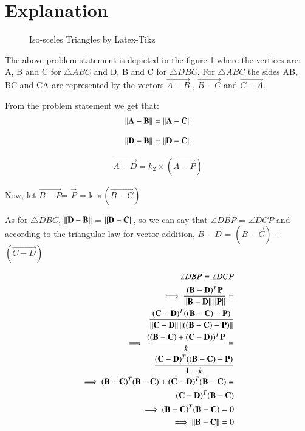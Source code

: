 \documentclass[journal,12pt,twocolumn]{IEEEtran}
\begin{document}
\section{Explanation}
\begin{figure}[!ht]
\centering
\resizebox{\columnwidth}{!}{}
\caption{Iso-sceles Triangles by Latex-Tikz}
\label{fig:iso_scelen}	
\end{figure}

The above problem statement is depicted in the figure \ref{fig:iso_scelen} where the vertices are: A, B and C for $\triangle ABC$ and D, B and C for $\triangle DBC$. For $\triangle ABC$ the sides AB, BC and CA are represented by the vectors $\vec{A-B}$ , $\vec{B-C}$ and $\vec{C-A}$.

From the problem statement we get that:
\begin{align}
\left\lVert\mathbf{A}-\mathbf{B}\right\rVert = \left\lVert\mathbf{A}-\mathbf{C}\right\rVert
\end{align}
\label{cond1}

\begin{align}
\left\lVert\mathbf{D}-\mathbf{B}\right\rVert = \left\lVert\mathbf{D}-\mathbf{C}\right\rVert
\end{align}
\label{cond2}

\begin{align}
\vec{A-D} = k_2 \times (\vec{A-P})
\end{align}

Now, let $\vec{B-P}$= $\vec{P}$ = k $\times (\vec{B-C})$

As for $\triangle DBC$, $\left\lVert\mathbf{D-B}\right\rVert$ = $\left\lVert\mathbf{D-C}\right\rVert$, so we can say that $\angle DBP$ = $\angle DCP$ and according to the triangular law for vector addition, $\vec{B-D}$ = $(\vec{B-C})$ + $(\vec{C-D})$

\begin{align}
\angle DBP = \angle DCP\\
\implies \frac{(\mathbf{B-D})^T \mathbf{P}}{\left\lVert\mathbf{B-D}\right\rVert\left\lVert\mathbf{P}\right\rVert}=\\
\frac{(\mathbf{C-D})^T ((\mathbf{B-C}) - \mathbf{P})}{\left\lVert\mathbf{C-D}\right\rVert\left\lVert((\mathbf{B-C}) - \mathbf{P})\right\rVert}\\
\implies \frac{((\mathbf{B-C}) + (\mathbf{C-D}))^T \mathbf{P}}{k}=\\
\frac{(\mathbf{C-D})^T ((\mathbf{B-C}) - \mathbf{P})}{1-k}\\
\implies (\mathbf{B-C})^T (\mathbf{B-C}) + (\mathbf{C-D})^T (\mathbf{B-C}) =\\
 (\mathbf{C-D})^T (\mathbf{B-C})\\
\implies (\mathbf{B-C})^T (\mathbf{B-C}) = 0\\
\implies \left\lVert\mathbf{B-C}\right\rVert = 0
\end{align}
\end{document}
